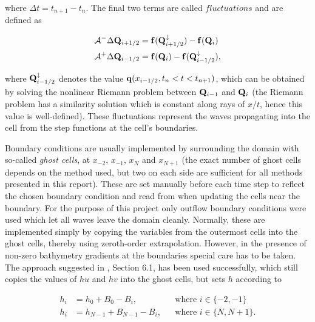 where $\Delta t = t_{n+1} - t_n$. The final two terms are called $fluctuations$ and are defined as

\begin{subequations}
\label{eq:fluctuations}
\begin{align}
  \mathcal{A}^- \Delta \vb Q_{i+1/2} &= \vb f(\vb Q_{i+1/2}^\downarrow) - \vb f(\vb Q_{i}) \\
  \mathcal{A}^+ \Delta \vb Q_{i-1/2} &= \vb f(\vb Q_{i}) - \vb f(\vb Q_{i-1/2}^\downarrow),
\end{align}
\end{subequations}

where $\vb Q_{i-1/2}^\downarrow$ denotes the value $\vb q(x_{i-1/2}, t_n < t < t_{n+1})$, which can be obtained by solving the nonlinear Riemann problem between $\vb Q_{i-1}$ and $\vb Q_i$ (the Riemann problem has a similarity solution which is constant along rays of $x/t$, hence this value is well-defined). These fluctuations represent the waves propagating into the cell from the step functions at the cell's boundaries.

Boundary conditions are usually implemented by surrounding the domain with so-called \emph{ghost cells}, at $x_{-2}$, $x_{-1}$, $x_N$ and $x_{N+1}$ (the exact number of ghost cells depends on the method used, but two on each side are sufficient for all methods presented in this report). These are set manually before each time step to reflect the chosen boundary condition and read from when updating the cells near the boundary. For the purpose of this project only outflow boundary conditions were used which let all waves leave the domain cleanly. Normally, these are implemented simply by copying the variables from the outermost cells into the ghost cells, thereby using zeroth-order extrapolation. However, in the presence of non-zero bathymetry gradients at the boundaries special care has to be taken. The approach suggested in \cite{leveque1998balancing}, Section 6.1, has been used successfully, which still copies the values of $hu$ and $hv$ into the ghost cells, but sets $h$ according to

\begin{subequations}
  \label{eq:bcs}
  \begin{align}
    h_i &= h_0 + B_0 - B_i, &&\mbox{where $i \in \{-2, -1\}$} \\
    h_i &= h_{N-1} + B_{N-1} - B_i, &&\mbox{where $i \in \{N, N+1\}$}.
  \end{align}
\end{subequations}

